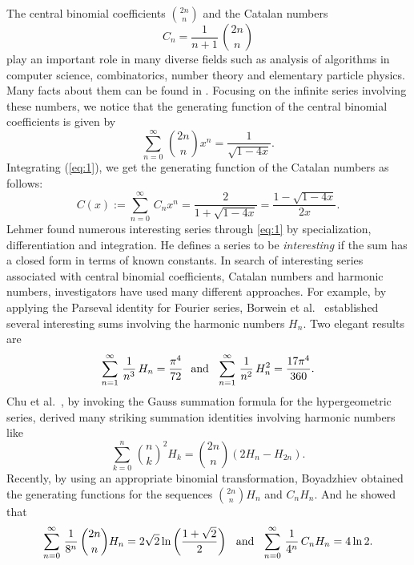 \documentclass[12pt,reqno]{article}
\begin{document}
The central binomial coefficients ${2n \choose n }$ and the Catalan numbers 
$$C_n = \frac{1}{n+1}\,{2n \choose n}$$
play an important role in many diverse fields such as analysis of algorithms in computer science, combinatorics, number theory and elementary particle physics. Many facts about them can be found in \cite{Gould, Stanley}. Focusing on the infinite series involving these numbers, we notice that the generating function of the central binomial coefficients is given by
\begin{equation} \label{eq:1}
\sum_{n=0}^\infty\, {2n \choose n} x^n = \frac{1}{\sqrt{1 - 4x}}.
\end{equation}
Integrating (\ref{eq:1}),  we get the generating function of the Catalan numbers as follows:
\begin{equation} 
\label{eq:2}
C(x):= \sum_{n=0}^\infty\,C_n x^n = \frac{2}{1+ \sqrt{1 - 4x}} = \frac{1 - \sqrt{1-4x}}{2x}. 
\end{equation}
Lehmer \cite{Lehmer} found numerous interesting series through \eqref{eq:1} by specialization, differentiation and integration. He defines a series to be {\it interesting} if the sum has a closed form in terms of known constants. In search of interesting series associated with central binomial coefficients, Catalan numbers and harmonic numbers, investigators have used many different approaches. For example, by applying the Parseval identity for Fourier series, Borwein et al.\ \cite{Borwein} established several interesting sums involving the harmonic numbers $H_n$. Two elegant results are
\begin{equation}
\sum_{n=1}^\infty\,\frac{1}{n^3}\,H_n = \frac{\pi^4}{72}\hspace{0.1in}\mbox{and}\hspace{0.1in} \sum_{n=1}^\infty\,\frac{1}{n^2}\,H_n^2 = \frac{17\pi^4}{360}.
\end{equation}
Chu et al.\ \cite{Chu}, by invoking the Gauss summation formula for the hypergeometric series, derived many striking summation identities involving harmonic numbers like
\begin{equation}
\sum_{k=0}^n\,{n \choose k}^2H_k = {2n \choose n}(2H_n-H_{2n}).
\end{equation}
Recently, by using an appropriate binomial transformation, Boyadzhiev \cite{Boy} obtained the generating functions for the sequences $\binom{2n}{n}H_n$ and $C_nH_n$. And he showed that
\begin{equation}
\sum_{n=0}^\infty\,\frac{1}{8^n}\,{2n \choose n}H_n = 2\sqrt{2}\ln\left(\frac{1 + \sqrt{2}}{2}\right)\hspace{0.1in}\mbox{and}\hspace{0.1in} 
\sum_{n=0}^\infty\,\frac{1}{4^n}\,C_nH_n = 4 \ln 2.
\end{equation}
\end{document}
